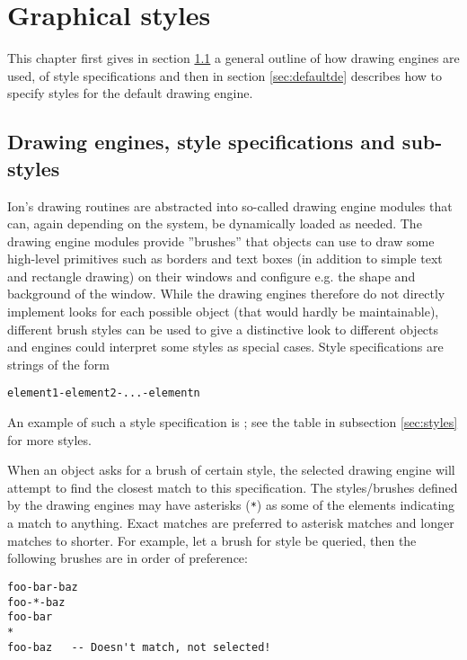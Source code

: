 
\chapter{Graphical styles}
\label{chap:gr}

This chapter first gives in section \ref{sec:engines} a general outline 
of how drawing engines are used, of style specifications and then
in section \ref{sec:defaultde} describes how to specify styles
for the default drawing engine.

\section{Drawing engines, style specifications and sub-styles}
\label{sec:engines}

Ion's drawing routines are abstracted into so-called drawing engine
modules that can, again depending on the system, be dynamically
loaded as needed. The drawing engine modules provide ''brushes''
that objects can use to draw some high-level primitives such
as borders and text boxes (in addition to simple text and rectangle
drawing) on their windows and configure e.g. the shape and 
background of the window. While the drawing engines therefore
do not directly implement looks for each possible object (that
would hardly be maintainable), different brush styles can be
used to give a distinctive look to different objects and engines
could interpret some styles as special cases. Style specifications 
are strings of the form

\begin{verbatim}
element1-element2-...-elementn
\end{verbatim}

An example of such a style specification is ;
see the table in subsection \ref{sec:styles} for more styles.

When an object asks for a brush of certain style, the selected
drawing engine will attempt to find the closest match to this
specification. The styles/brushes defined by the drawing engines 
may have asterisks (\verb!*!) as some of the elements indicating
a match to anything. Exact matches are preferred to asterisk
matches and longer matches to shorter. For example, let a brush
for style  be queried, then the following
brushes are in order of preference:

\begin{verbatim}
foo-bar-baz
foo-*-baz
foo-bar
*
foo-baz   -- Doesn't match, not selected!
\end{verbatim}


